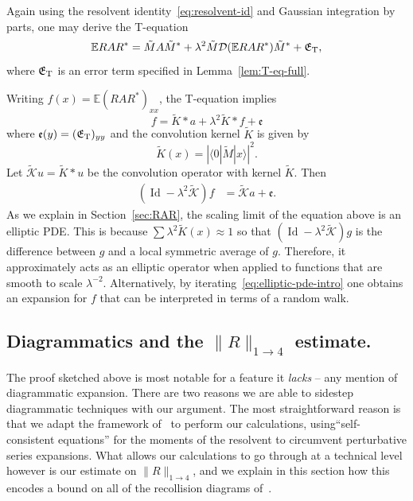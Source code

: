 \documentclass[11pt]{amsart}
\def\Expec{{\mathbb E}}
\newcommand{\Id}{{\operatorname*{Id}}}
\def\Braket#1{\langle{#1}\rangle}
\newcommand{\mcal}[1]{{\mathcal{#1}}}
\numberwithin{equation}{section}
\numberwithin{theorem}{section}
\begin{document}
Again using the resolvent identity~\eqref{eq:resolvent-id} and Gaussian integration by parts, one may derive the T-equation
\begin{equation}
\label{eq:T-eq}
\Expec RAR^* = \tilde{M}A\tilde{M}^* + \lambda^2\tilde{M}\mathcal{D}(\Expec RAR^*)\tilde{M}^* + \mathfrak{E}_{\rm T},
\end{equation}
where $\mathfrak{E}_{\rm T}$ is an error term specified in Lemma~\ref{lem:T-eq-full}.

Writing $f(x) = \Expec (RAR^*)_{xx}$, the T-equation implies
\begin{equation}
\label{eq:elliptic-pde-intro}
f = \tilde{K} \ast a + \lambda^2 \tilde{K} \ast f + \mathfrak{e}
\end{equation}
where $\mathfrak{e}(y) = (\mathfrak{E}_{\rm T})_{yy}$ and the convolution kernel $\tilde{K}$ is given by
\begin{equation*}
\tilde{K}(x) = |\Braket{0| \tilde{M}|x}|^2.
\end{equation*}
Let $\tilde{\mcal{K}} u = \tilde{K}\ast u$ be the convolution operator with kernel $\tilde{K}$.  Then
\begin{equation*}
\begin{aligned}
(\Id - \lambda^2\tilde{\mcal{K}}) f
&=  \mcal{\tilde{K}}a + \mathfrak{e}.
\end{aligned}
\end{equation*}
As we explain in Section~\ref{sec:RAR}, the scaling limit of the equation above is an elliptic PDE.
This is because $\sum \lambda^2 \tilde{K}(x) \approx 1$ so that $(\Id - \lambda^2\tilde{\mcal{K}})g$ is the difference
between $g$ and a local symmetric average of $g$. Therefore, it approximately acts as an elliptic operator when applied
to functions that are smooth to scale $\lambda^{-2}$.  Alternatively, by iterating~\eqref{eq:elliptic-pde-intro} one obtains an expansion for $f$ that can be interpreted in terms of a random walk.


\subsection{Diagrammatics and the $\|R\|_{1\to 4}$ estimate.}
\label{sec:nodiagrams}
The proof sketched above is most notable for a feature it \textit{lacks} -- any mention of diagrammatic
expansion.  There are two reasons we are able to sidestep diagrammatic techniques with our argument.
The most straightforward reason is that we adapt the framework of~\cite{Y3Teq} to perform our calculations, using``self-consistent equations'' for the
moments of the resolvent to circumvent perturbative series expansions.
What allows our calculations to go through at a technical level however is our estimate on $\|R\|_{1\to 4}$, and we explain in this section how this encodes a bound on all of the recollision diagrams
of~\cite{ESYrecollision}.
\end{document}
